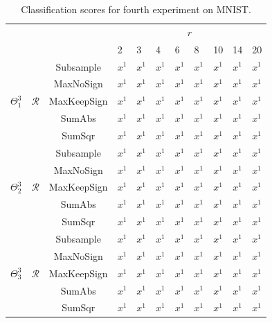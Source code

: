 \documentclass[12pt,a4paper,oneside,english]{UPBThesis}
\begin{document}
\renewcommand{\arraystretch}{1.2}
\begin{table}
  \caption{Classification scores for fourth experiment on MNIST.}
  \label{table:RecoderEvMNISTSmallResultsRr}
  \begin{tabularx}{\textwidth}{ccc|RRRRRRRR|}
    & & &  \tabularnewline
    & & & 2 & 3 & 4 & 6 & 8 & 10 & 14 & 20 \tabularnewline\hline
     &  & Subsample   & $x^1$ & $x^1$ & $x^1$ & $x^1$ & $x^1$ & $x^1$ & $x^1$ & $x^1$ \tabularnewline
     &  & MaxNoSign   & $x^1$ & $x^1$ & $x^1$ & $x^1$ & $x^1$ & $x^1$ & $x^1$ & $x^1$ \tabularnewline
     &  & MaxKeepSign & $x^1$ & $x^1$ & $x^1$ & $x^1$ & $x^1$ & $x^1$ & $x^1$ & $x^1$ \tabularnewline
     &  & SumAbs      & $x^1$ & $x^1$ & $x^1$ & $x^1$ & $x^1$ & $x^1$ & $x^1$ & $x^1$ \tabularnewline
     &  & SumSqr      & $x^1$ & $x^1$ & $x^1$ & $x^1$ & $x^1$ & $x^1$ & $x^1$ & $x^1$ \tabularnewline\hline\hline
     &  & Subsample   & $x^1$ & $x^1$ & $x^1$ & $x^1$ & $x^1$ & $x^1$ & $x^1$ & $x^1$ \tabularnewline
     &  & MaxNoSign   & $x^1$ & $x^1$ & $x^1$ & $x^1$ & $x^1$ & $x^1$ & $x^1$ & $x^1$ \tabularnewline
     &  & MaxKeepSign & $x^1$ & $x^1$ & $x^1$ & $x^1$ & $x^1$ & $x^1$ & $x^1$ & $x^1$ \tabularnewline
     &  & SumAbs      & $x^1$ & $x^1$ & $x^1$ & $x^1$ & $x^1$ & $x^1$ & $x^1$ & $x^1$ \tabularnewline
     &  & SumSqr      & $x^1$ & $x^1$ & $x^1$ & $x^1$ & $x^1$ & $x^1$ & $x^1$ & $x^1$ \tabularnewline\hline\hline
     &  & Subsample   & $x^1$ & $x^1$ & $x^1$ & $x^1$ & $x^1$ & $x^1$ & $x^1$ & $x^1$ \tabularnewline
     &  & MaxNoSign   & $x^1$ & $x^1$ & $x^1$ & $x^1$ & $x^1$ & $x^1$ & $x^1$ & $x^1$ \tabularnewline
     &  & MaxKeepSign & $x^1$ & $x^1$ & $x^1$ & $x^1$ & $x^1$ & $x^1$ & $x^1$ & $x^1$ \tabularnewline
     &  & SumAbs      & $x^1$ & $x^1$ & $x^1$ & $x^1$ & $x^1$ & $x^1$ & $x^1$ & $x^1$ \tabularnewline
     &  & SumSqr      & $x^1$ & $x^1$ & $x^1$ & $x^1$ & $x^1$ & $x^1$ & $x^1$ & $x^1$ \tabularnewline\hline
  \end{tabularx}
\end{table}
\renewcommand{\arraystretch}{1.0}
\end{document}
